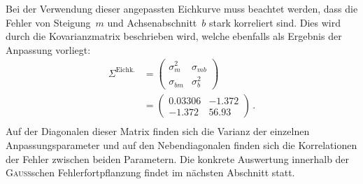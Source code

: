 \documentclass[11pt, a4paper]{article}
\numberwithin{equation}{section}
\begin{document}
Bei der Verwendung dieser angepassten Eichkurve muss beachtet werden, dass die Fehler von Steigung~$m$ und Achsenabschnitt~$b$ stark korreliert sind.
Dies wird durch die Kovarianzmatrix beschrieben wird, welche ebenfalls als Ergebnis der Anpassung vorliegt:
\begin{align*}
			\Sigma^\mathrm{Eichk.} &= \begin{pmatrix}
			\sigma_m^2 & \sigma_{mb} \\
			\sigma_{bm} & \sigma_b^2
			\end{pmatrix}\\
			&= \begin{pmatrix}
			\num{0.03306} & \num{-1.372} \\
			\num{-1.372}    & \num{56.93}
			\end{pmatrix} \, \text{.}\\
\end{align*}
Auf der Diagonalen dieser Matrix finden sich die Varianz der einzelnen Anpassungsparameter und auf den Nebendiagonalen finden sich die Korrelationen der Fehler zwischen beiden Parametern.
Die konkrete Auswertung innerhalb der \textsc{Gauß}schen Fehlerfortpflanzung findet im nächsten Abschnitt statt.
\end{document}
